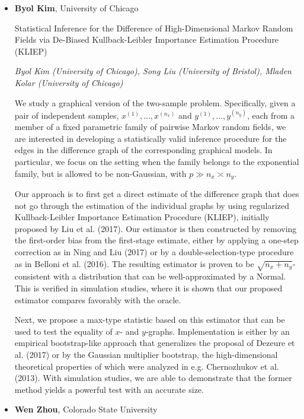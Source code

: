 \begin{itemize}
\item \textbf{Byol Kim}, University of Chicago

Statistical Inference for the Difference of High-Dimensional Markov Random Fields via De-Biased Kullback-Leibler Importance Estimation Procedure (KLIEP)

\emph{\footnotesize Byol Kim (University of Chicago), Song Liu (University of Bristol), Mladen Kolar (University of Chicago)}

We study a graphical version of the two-sample problem. Specifically, given a pair of independent samples, $x^{(1)}, \dots, x^{(n_x)}$ and $y^{(1)}, \dots, y^{(n_y)}$, each from a member of a fixed parametric family of pairwise Markov random fields, we are interested in developing a statistically valid inference procedure for the edges in the difference graph of the corresponding graphical models. In particular, we focus on the setting when the family belongs to the exponential family, but is allowed to be non-Gaussian, with $p \gg n_x \asymp n_y$.

Our approach is to first get a direct estimate of the difference graph that does not go through the estimation of the individual graphs by using regularized Kullback-Leibler Importance Estimation Procedure (KLIEP), initially proposed by Liu et al. (2017). Our estimator is then constructed by removing the first-order bias from the first-stage estimate, either by applying a one-step correction as in Ning and Liu (2017) or by a double-selection-type procedure as in Belloni et al. (2016). The resulting estimator is proven to be $\sqrt{n_x + n_y}$-consistent with a distribution that can be well-approximated by a Normal. This is verified in simulation studies, where it is shown that our proposed estimator compares favorably with the oracle.

Next, we propose a max-type statistic based on this estimator that can be used to test the equality of $x$- and $y$-graphs. Implementation is either by an empirical bootstrap-like approach that generalizes the proposal of Dezeure et al. (2017) or by the Gaussian multiplier bootstrap, the high-dimensional theoretical properties of which were analyzed in e.g. Chernozhukov et al. (2013). With simulation studies, we are able to demonstrate that the former method yields a powerful test with an accurate size.

\item \textbf{Wen Zhou}, Colorado State University


\end{itemize}
